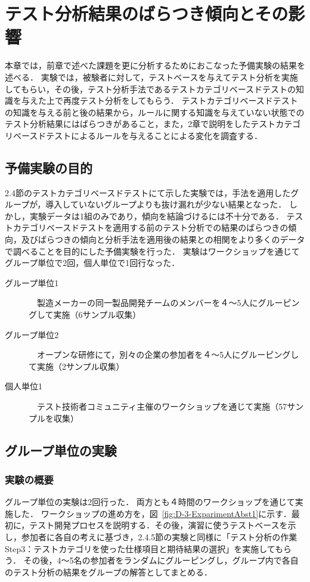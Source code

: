 \chapter{テスト分析結果のばらつき傾向とその影響}\label{chap:3}
本章では，前章で述べた課題を更に分析するためにおこなった予備実験の結果を述べる．
実験では，被験者に対して，テストベースを与えてテスト分析を実施してもらい，その後，テスト分析手法であるテストカテゴリベースドテストの知識を与えた上で再度テスト分析をしてもらう．
テストカテゴリベースドテストの知識を与える前と後の結果から，ルールに関する知識を与えていない状態でのテスト分析結果にはばらつきがあること，また，2章で説明をしたテストカテゴリベースドテストによるルールを与えることによる変化を調査する．

\newpage
\section{予備実験の目的} \label{sec:3-1}
2.4節のテストカテゴリベースドテストにて示した実験では，手法を適用したグループが，導入していないグループよりも抜け漏れが少ない結果となった．
しかし，実験データは1組のみであり，傾向を結論づけるには不十分である．
テストカテゴリベースドテストを適用する前のテスト分析での結果のばらつきの傾向，及びばらつきの傾向と分析手法を適用後の結果との相関をより多くのデータで調べることを目的にした予備実験を行った．
実験はワークショップを通じてグループ単位で2回，個人単位で1回行なった．
\begin{description}
  \item[グループ単位1]　製造メーカーの同一製品開発チームのメンバーを４〜5人にグルーピングして実施（6サンプル収集）
  \item[グループ単位2]　オープンな研修にて，別々の企業の参加者を４〜5人にグルーピングして実施（2サンプル収集）
  \item[個人単位1]　テスト技術者コミュニティ主催のワークショップを通じて実施（57サンプルを収集）
\end{description}

\newpage
\section{グループ単位の実験}
\subsection{実験の概要}
グループ単位の実験は2回行った．
両方とも４時間のワークショップを通じて実施した．
ワークショップの進め方を，図~\ref{fig:D-3-ExparimentAbst1}に示す．最初に，テスト開発プロセスを説明する．その後，演習に使うテストベースを示し，参加者に各自の考えに基づき，2.4.5節の実験と同様に「テスト分析の作業Step3：テストカテゴリを使った仕様項目と期待結果の選択」を実施してもらう．
その後，4〜5名の参加者をランダムにグルーピングし，グループ内で各自のテスト分析の結果をグループの解答としてまとめる．


